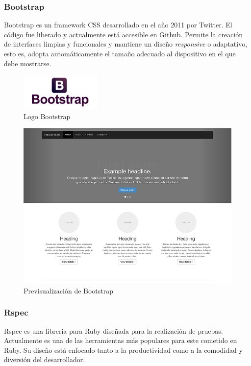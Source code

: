 		\subsubsection{Bootstrap}
		Bootstrap es un framework \ac{CSS} desarrollado en el año 2011 por Twitter. El código fue liberado y actualmente está accesible en Github. Permite la creación de interfaces limpias y funcionales y mantiene un diseño \textit{responsive} o adaptativo, esto es, adopta automáticamente el tamaño adecuado al dispositivo en el que debe mostrarse.
		
		\begin{figure}[H]
		\centering
		\includegraphics[width=40mm, fbox={\fboxrule} 4mm]{images/04-metodo/23-bootstrap_logo.png}
		\caption{Logo Bootstrap}
		\label{fig:bootstrap-logo}
		\end{figure}
		
		\begin{figure}[H]
		\centering
		\includegraphics[width=120mm, fbox={\fboxrule} 4mm]{images/04-metodo/24-bootstrap_preview.jpg}
		\caption{Previsualización de Bootstrap}
		\label{fig:bootstrap-preview}
		\end{figure}
		
		\subsubsection{Rspec}
		Rspec es una libreria para Ruby diseñada para la realización de pruebas. Actualmente es una de las herramientas más populares para este cometido en Ruby. Su diseño está enfocado tanto a la productividad como a la comodidad y diversión del desarrollador.

